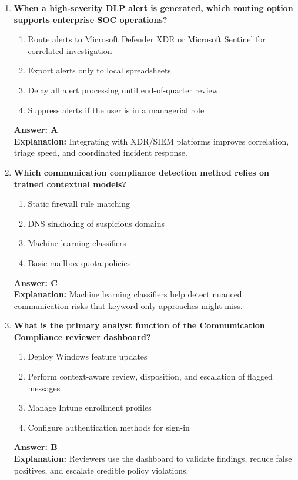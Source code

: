 \documentclass[10pt]{article}
\begin{document}
\begin{enumerate}[leftmargin=*]
\item \textbf{When a high-severity DLP alert is generated, which routing option supports enterprise SOC operations?}
\begin{enumerate}[label=\Alph*.]
  \item Route alerts to Microsoft Defender XDR or Microsoft Sentinel for correlated investigation
  \item Export alerts only to local spreadsheets
  \item Delay all alert processing until end-of-quarter review
  \item Suppress alerts if the user is in a managerial role
\end{enumerate}
\textbf{Answer: A}\\
\textbf{Explanation:} Integrating with XDR/SIEM platforms improves correlation, triage speed, and coordinated incident response.

\item \textbf{Which communication compliance detection method relies on trained contextual models?}
\begin{enumerate}[label=\Alph*.]
  \item Static firewall rule matching
  \item DNS sinkholing of suspicious domains
  \item Machine learning classifiers
  \item Basic mailbox quota policies
\end{enumerate}
\textbf{Answer: C}\\
\textbf{Explanation:} Machine learning classifiers help detect nuanced communication risks that keyword-only approaches might miss.

\item \textbf{What is the primary analyst function of the Communication Compliance reviewer dashboard?}
\begin{enumerate}[label=\Alph*.]
  \item Deploy Windows feature updates
  \item Perform context-aware review, disposition, and escalation of flagged messages
  \item Manage Intune enrollment profiles
  \item Configure authentication methods for sign-in
\end{enumerate}
\textbf{Answer: B}\\
\textbf{Explanation:} Reviewers use the dashboard to validate findings, reduce false positives, and escalate credible policy violations.


\end{enumerate}
\end{document}

